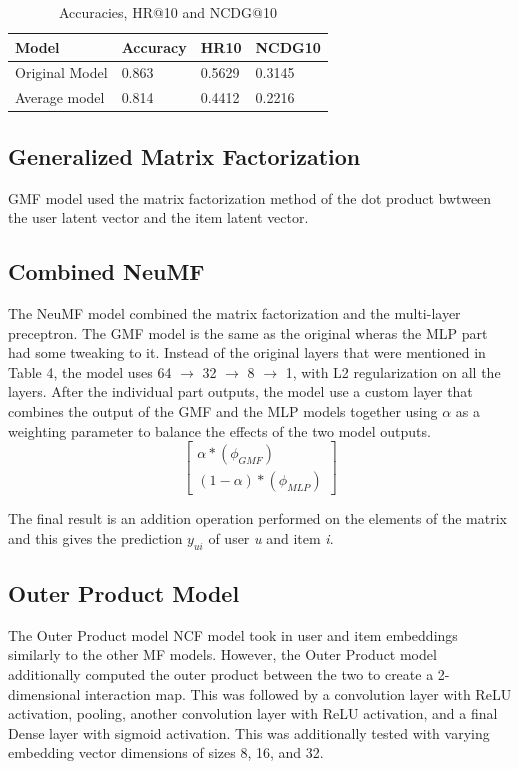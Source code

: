 \documentclass{article}
\begin{document}
\begin{table}[h]
\caption{Accuracies, HR@10 and NCDG@10}
\centering
\begin{tabular}{llll}
\toprule
Model & Accuracy & HR10 & NCDG10 \\
\midrule
Original Model & 0.863 & 0.5629 & 0.3145 \\
Average model & 0.814 & 0.4412 & 0.2216 \\
\bottomrule
\end{tabular}
\label{tab:table6}
\end{table}

\subsection{Generalized Matrix Factorization}
GMF model used the matrix factorization method of the dot product bwtween the user latent vector and the item latent vector.

\subsection{Combined NeuMF}
The NeuMF model combined the matrix factorization and the multi-layer preceptron. The GMF model is the same as the original wheras the MLP part had some tweaking to it. Instead of the original layers that were mentioned in Table 4, the model uses 64 $\rightarrow$ 32 $\rightarrow$ 8 $\rightarrow$ 1, with L2 regularization on all the layers. After the individual part outputs, the model use a custom layer that combines the output of the GMF and the MLP models together using $\alpha$ as a weighting parameter to balance the effects of the two model outputs.\\

\[
\begin{bmatrix}
    \alpha * (\phi_{GMF}) \\
    (1 - \alpha) * (\phi_{MLP})  
\end{bmatrix}
\]

The final result is an addition operation performed on the elements of the matrix and this gives the prediction $y_{ui}$ of user \emph{u} and item \emph{i}.

\subsection{Outer Product Model}
The Outer Product model NCF model took in user and item embeddings similarly to the other MF models. However, the Outer Product model additionally computed the outer product between the two to create a 2-dimensional interaction map. This was followed by a convolution layer with ReLU activation, pooling, another convolution layer with ReLU activation, and a final Dense layer with sigmoid activation. This was additionally tested with varying embedding vector dimensions of sizes 8, 16, and 32.
\end{document}
